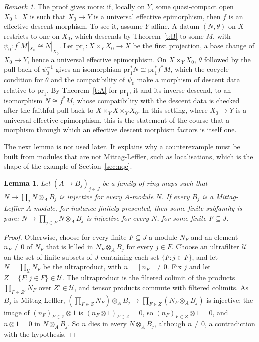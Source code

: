\documentclass[11pt,a4paper]{amsart}
\newtheorem{lemma}[theorem]{Lemma}
\theoremstyle{definition}
\theoremstyle{remark}
\newtheorem{remark}[theorem]{Remark}
\begin{document}
\begin{remark}\label{r:qcopen}
The proof gives more: if, locally on $Y$, some quasi-compact open $X_0\subseteq X$ is such that $X_0\to Y$ is a universal effective epimorphism, then $f$ is an effective descent morphism. To see it, assume $Y$ affine. A datum $(N,\theta)$ on $X$ restricts to one on $X_0$, which descends by Theorem~\ref{t:B} to some $M$, with $\psi_0\colon f^*M|_{X_0}\cong N|_{X_0}$. Let $\mathrm{pr}_1\colon X\times_YX_0\to X$ be the first projection, a base change of $X_0\to Y$, hence a universal effective epimorphism. On $X\times_YX_0$, $\theta$ followed by the pull-back of $\psi_0^{-1}$ gives an isomorphism $\mathrm{pr}_1^*N\cong\mathrm{pr}_1^*f^*M$, which the cocycle condition for $\theta$ and the compatibility of $\psi_0$ make a morphism of descent data relative to $\mathrm{pr}_1$. By Theorem~\ref{t:A} for $\mathrm{pr}_1$, it and its inverse descend, to an isomorphism $N\cong f^*M$, whose compatibility with the descent data is checked after the faithful pull-back to $X\times_YX\times_YX_0$. In this setting, where $X_0 \to Y$ is a universal effective epimorphism, this is the statement of the course that a morphism through which an effective descent morphism factors is itself one.
\end{remark}

The next lemma is not used later. It explains why a counterexample must be built from modules that are not Mittag-Leffler, such as localisations, which is the shape of the example of Section~\ref{sec:nqc}.

\begin{lemma}\label{l:ml}
Let $(A\to B_j)_{j\in J}$ be a family of ring maps such that $N\to\prod_jN\otimes_AB_j$ is injective for every $A$-module $N$. If every $B_j$ is a Mittag-Leffler $A$-module, for instance finitely presented, then some finite subfamily is pure: $N\to\prod_{j\in F}N\otimes_AB_j$ is injective for every $N$, for some finite $F\subseteq J$.
\end{lemma}

\begin{proof}
Otherwise, choose for every finite $F\subseteq J$ a module $N_F$ and an element $n_F\neq0$ of $N_F$ that is killed in $N_F\otimes_AB_j$ for every $j\in F$. Choose an ultrafilter $\mathcal U$ on the set of finite subsets of $J$ containing each set $\{F:j\in F\}$, and let $N=\prod_{\mathcal U}N_F$ be the ultraproduct, with $n=[n_F]\neq0$. Fix $j$ and let $Z=\{F:j\in F\}\in\mathcal U$. The ultraproduct is the filtered colimit of the products $\prod_{F\in Z'}N_F$ over $Z'\in\mathcal U$, and tensor products commute with filtered colimits. As $B_j$ is Mittag-Leffler, $(\prod_{F\in Z}N_F)\otimes_AB_j\to\prod_{F\in Z}(N_F\otimes_AB_j)$ is injective; the image of $(n_F)_{F\in Z}\otimes1$ is $(n_F\otimes1)_{F\in Z}=0$, so $(n_F)_{F\in Z}\otimes1=0$, and $n\otimes1=0$ in $N\otimes_AB_j$. So $n$ dies in every $N\otimes_AB_j$, although $n\neq0$, a contradiction with the hypothesis.
\end{proof}
\end{document}
